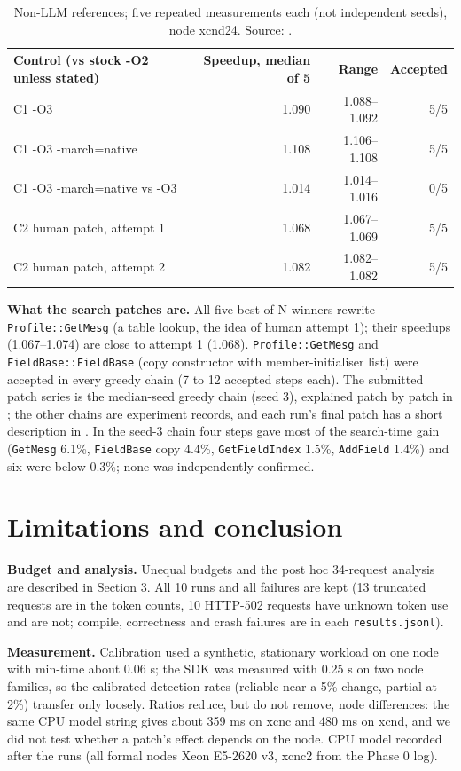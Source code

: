 \documentclass[10pt,a4paper]{article}
\begin{document}
\begin{table}[t]
\centering
\small
\setlength{\tabcolsep}{3.5pt}
\begin{tabular}{lrrr}
\toprule
Control (vs stock -O2 unless stated) & Speedup, median of 5 & Range & Accepted \\
\midrule
C1 -O3 & 1.090 & 1.088--1.092 & 5/5 \\
C1 -O3 -march=native & 1.108 & 1.106--1.108 & 5/5 \\
C1 -O3 -march=native vs -O3 & 1.014 & 1.014--1.016 & 0/5 \\
C2 human patch, attempt 1 & 1.068 & 1.067--1.069 & 5/5 \\
C2 human patch, attempt 2 & 1.082 & 1.082--1.082 & 5/5 \\
\bottomrule
\end{tabular}
\caption{Non-LLM references; five repeated measurements each (not independent seeds), node xcnd24. Source: .}
\label{tab:ctl}
\end{table}
\textbf{What the search patches are.} All five best-of-N winners rewrite \texttt{Profile::GetMesg} (a table lookup, the idea of human attempt 1); their speedups (1.067--1.074) are close to attempt 1 (1.068). \texttt{Profile::GetMesg} and \texttt{FieldBase::FieldBase} (copy constructor with member-initialiser list) were accepted in every greedy chain (7 to 12 accepted steps each). The submitted patch series is the median-seed greedy chain (seed 3), explained patch by patch in ; the other chains are experiment records, and each run's final patch has a short description in . In the seed-3 chain four steps gave most of the search-time gain (\texttt{GetMesg} 6.1\%, \texttt{FieldBase} copy 4.4\%, \texttt{GetFieldIndex} 1.5\%, \texttt{AddField} 1.4\%) and six were below 0.3\%; none was independently confirmed.

\section{Limitations and conclusion}
\textbf{Budget and analysis.} Unequal budgets and the post hoc 34-request analysis are described in Section 3. All 10 runs and all failures are kept (13 truncated requests are in the token counts, 10 HTTP-502 requests have unknown token use and are not; compile, correctness and crash failures are in each \texttt{results.jsonl}).

\textbf{Measurement.} Calibration used a synthetic, stationary workload on one node with min-time about 0.06 s; the SDK was measured with 0.25 s on two node families, so the calibrated detection rates (reliable near a 5\% change, partial at 2\%) transfer only loosely. Ratios reduce, but do not remove, node differences: the same CPU model string gives about 359 ms on xcnc and 480 ms on xcnd, and we did not test whether a patch's effect depends on the node. CPU model recorded after the runs (all formal nodes Xeon E5-2620 v3, xcnc2 from the Phase 0 log).
\end{document}
